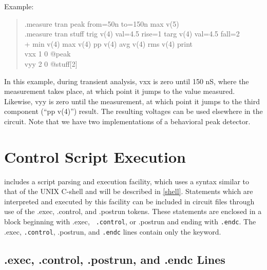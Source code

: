 Example:
\begin{quote}\vt
    .measure tran peak from=50n to=150n max v(5)\\
    .measure tran stuff trig v(4) val=4.5 rise=1 targ v(4) val=4.5 fall=2\\
    + min v(4) max v(4) pp v(4) avg v(4) rms v(4) print\\
    vxx 1 0 @peak\\
    vyy 2 0 @stuff[2]\\
\end{quote}

In this example, during transient analysis, {\vt vxx} is zero until
150 nS, where the measurement takes place, at which point it jumps to
the value measured.  Likewise, {\vt vyy} is zero until the
measurement, at which point it jumps to the third component (``{\vt pp
v(4)}'') result.  The resulting voltages can be used elsewhere in the
circuit.  Note that we have two implementations of a behavioral peak
detector.


\section{Control Script Execution}


{\WRspice} includes a script parsing and execution facility, which
uses a syntax similar to that of the UNIX C-shell and will be
described in \ref{shell}.  Statements which are interpreted and
executed by this facility can be included in circuit files through use
of the {\vt .exec}, {\vt .control}, and {\vt .postrun} tokens.  These
statements are enclosed in a block beginning with {\vt .exec}, {\tt
.control}, or {\vt .postrun} and ending with {\tt .endc}.  The {\vt
.exec}, {\tt.control}, {\vt .postrun}, and {\tt .endc} lines contain
only the keyword.

\subsection{{\vt .exec}, {\vt .control}, {\vt .postrun}, and {\vt .endc} Lines}
\label{control}

